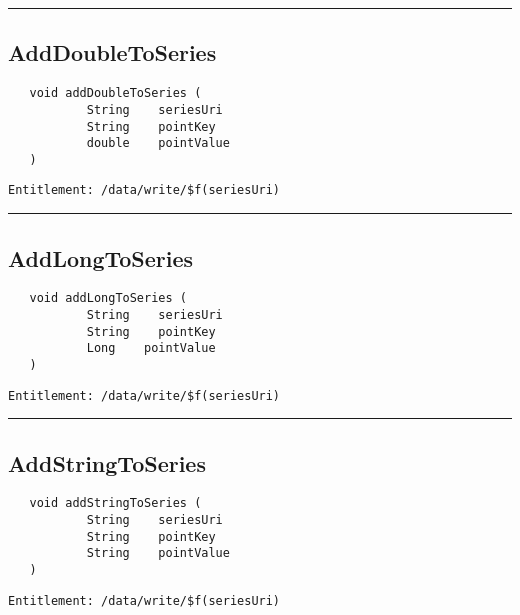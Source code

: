 \rule{12cm}{2pt}
\subsection{AddDoubleToSeries}
\label{Api:AddDoubleToSeries}
\begin{verbatim}
   void addDoubleToSeries (
           String    seriesUri
           String    pointKey
           double    pointValue
   )
\end{verbatim}
\begin{Verbatim}[fontsize=\small, formatcom=\color{Maroon}]
  Entitlement: /data/write/$f(seriesUri)
\end{Verbatim}



\rule{12cm}{2pt}
\subsection{AddLongToSeries}
\label{Api:AddLongToSeries}
\begin{verbatim}
   void addLongToSeries (
           String    seriesUri
           String    pointKey
           Long    pointValue
   )
\end{verbatim}
\begin{Verbatim}[fontsize=\small, formatcom=\color{Maroon}]
  Entitlement: /data/write/$f(seriesUri)
\end{Verbatim}



\rule{12cm}{2pt}
\subsection{AddStringToSeries}
\label{Api:AddStringToSeries}
\begin{verbatim}
   void addStringToSeries (
           String    seriesUri
           String    pointKey
           String    pointValue
   )
\end{verbatim}
\begin{Verbatim}[fontsize=\small, formatcom=\color{Maroon}]
  Entitlement: /data/write/$f(seriesUri)
\end{Verbatim}



